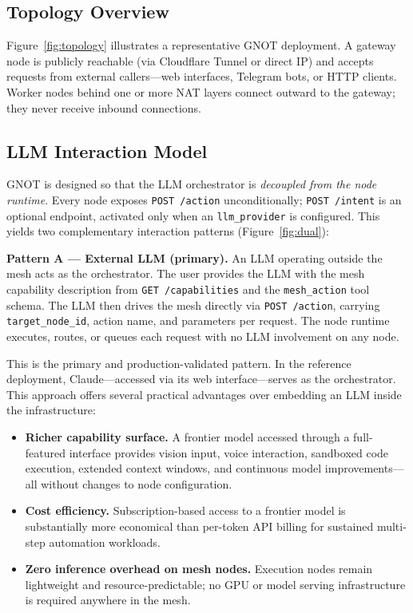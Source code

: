 \documentclass[10pt,twocolumn]{article}
\begin{document}
\subsection{Topology Overview}

Figure~\ref{fig:topology} illustrates a representative GNOT deployment.
A gateway node is publicly reachable (via Cloudflare Tunnel or direct IP)
and accepts requests from external callers---web interfaces, Telegram
bots, or HTTP clients. Worker nodes behind one or more NAT layers
connect outward to the gateway; they never receive inbound connections.

\subsection{LLM Interaction Model}
\label{sec:dual}

GNOT is designed so that the LLM orchestrator is \emph{decoupled from
the node runtime}. Every node exposes \texttt{POST /action}
unconditionally; \texttt{POST /intent} is an optional endpoint,
activated only when an \texttt{llm\_provider} is configured. This
yields two complementary interaction patterns
(Figure~\ref{fig:dual}):

\textbf{Pattern A --- External LLM (primary).}
An LLM operating outside the mesh acts as the orchestrator. The user
provides the LLM with the mesh capability description from
\texttt{GET /capabilities} and the \texttt{mesh\_action} tool schema.
The LLM then drives the mesh directly via \texttt{POST /action},
carrying \texttt{target\_node\_id}, action name, and parameters per
request. The node runtime executes, routes, or queues each request with
no LLM involvement on any node.

This is the primary and production-validated pattern. In the reference
deployment, Claude---accessed via its web interface---serves as the
orchestrator. This approach offers several practical advantages over
embedding an LLM inside the infrastructure:

\begin{itemize}[noitemsep, leftmargin=12pt]
  \item \textbf{Richer capability surface.} A frontier model accessed
    through a full-featured interface provides vision input, voice
    interaction, sandboxed code execution, extended context windows,
    and continuous model improvements---all without changes to node
    configuration.
  \item \textbf{Cost efficiency.} Subscription-based access to a
    frontier model is substantially more economical than per-token API
    billing for sustained multi-step automation workloads.
  \item \textbf{Zero inference overhead on mesh nodes.} Execution nodes
    remain lightweight and resource-predictable; no GPU or model
    serving infrastructure is required anywhere in the mesh.
\end{itemize}
\end{document}
